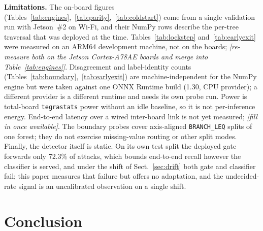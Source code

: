 \documentclass[runningheads]{llncs}
\newcommand{\ph}[1]{{\color{gray}\textit{[#1]}}}
\begin{document}
\textbf{Limitations.} The on-board figures (Tables~\ref{tab:engines},~\ref{tab:parity},~\ref{tab:coldstart}) come from a single validation run with Jetson~\#2 on Wi-Fi, and their NumPy rows describe the per-tree traversal that was deployed at the time. Tables~\ref{tab:lockstep} and~\ref{tab:earlyexit} were measured on an ARM64 development machine, not on the boards; \ph{re-measure both on the Jetson Cortex-A78AE boards and merge into Table~\ref{tab:engines}}. Disagreement and label-identity counts (Tables~\ref{tab:boundary},~\ref{tab:earlyexit}) are machine-independent for the NumPy engine but were taken against one ONNX Runtime build (1.30, CPU provider); a different provider is a different runtime and needs its own probe run. Power is total-board \texttt{tegrastats} power without an idle baseline, so it is not per-inference energy. End-to-end latency over a wired inter-board link is not yet measured; \ph{fill in once available}. The boundary probes cover axis-aligned \texttt{BRANCH\_LEQ} splits of one forest; they do not exercise missing-value routing or other split modes. Finally, the detector itself is static. On its own test split the deployed gate forwards only 72.3\% of attacks, which bounds end-to-end recall however the classifier is served, and under the shift of Sect.~\ref{sec:drift} both gate and classifier fail; this paper measures that failure but offers no adaptation, and the undecided-rate signal is an uncalibrated observation on a single shift.

\section{Conclusion}
\end{document}
